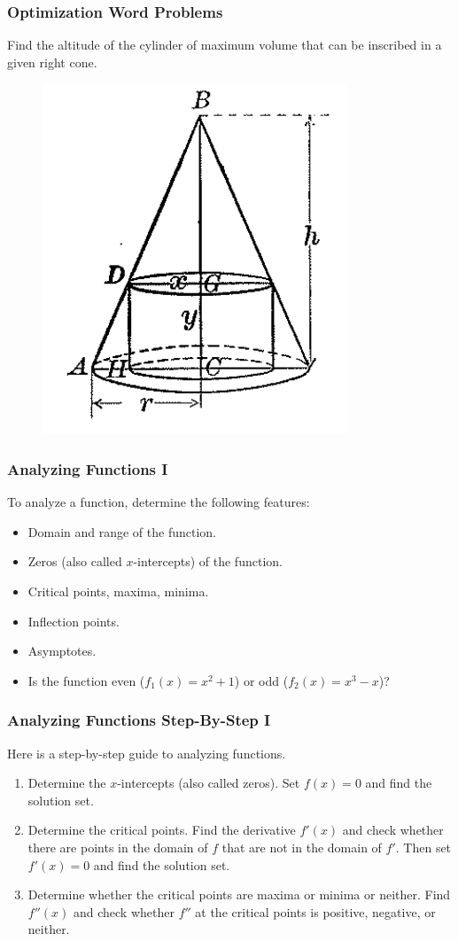 \documentclass[xcolor=dvipsnames]{beamer}
\begin{document}
\begin{frame}
  \frametitle{Optimization Word Problems}
{\ubung} Find the altitude of the cylinder of maximum volume that can
be inscribed in a given right cone.
  \begin{figure}[h]
    \includegraphics[scale=.3]{./diagrams/optcone.png}
  \end{figure}
\end{frame}

\begin{frame}
  \frametitle{Analyzing Functions I}
To analyze a function, determine the following features:
\begin{itemize}
\item Domain and range of the function.
\item Zeros (also called $x$-intercepts) of the function.
\item Critical points, maxima, minima.
\item Inflection points.
\item Asymptotes.
\item Is the function even ($f_{1}(x)=x^{2}+1$) or odd ($f_{2}(x)=x^{3}-x$)?
\end{itemize}
\end{frame}

\begin{frame}
  \frametitle{Analyzing Functions Step-By-Step I}
Here is a step-by-step guide to analyzing functions.
\begin{enumerate}
\item Determine the $x$-intercepts (also called zeros). Set $f(x)=0$
  and find the solution set.
\item Determine the critical points. Find the derivative $f'(x)$ and
  check whether there are points in the domain of $f$ that are not in
  the domain of $f'$. Then set $f'(x)=0$ and find the solution set.
\item Determine whether the critical points are maxima or minima or
  neither. Find $f''(x)$ and check whether $f''$ at the critical
  points is positive, negative, or neither. 
\end{enumerate}
\end{frame}
\end{document}
